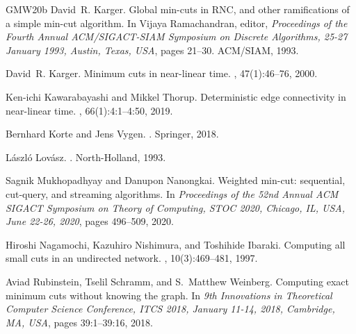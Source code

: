 \documentclass[10pt,a4paper]{article}
\newcommand{\1}{\mathbf{1}}
\theoremstyle{definition}
\begin{document}
\begin{thebibliography}{GMW20b}
David~R. Karger.
\newblock Global min-cuts in {RNC}, and other ramifications of a simple min-cut
  algorithm.
\newblock In Vijaya Ramachandran, editor, {\em Proceedings of the Fourth Annual
  {ACM/SIGACT-SIAM} Symposium on Discrete Algorithms, 25-27 January 1993,
  Austin, Texas, {USA}}, pages 21--30. {ACM/SIAM}, 1993.

David~R. Karger.
\newblock Minimum cuts in near-linear time.
, 47(1):46--76, 2000.

Ken{-}ichi Kawarabayashi and Mikkel Thorup.
\newblock Deterministic edge connectivity in near-linear time.
, 66(1):4:1--4:50, 2019.

Bernhard Korte and Jens Vygen.
.
\newblock Springer, 2018.

L{\'{a}}szl{\'{o}} Lov{\'{a}}sz.
.
\newblock North-Holland, 1993.

Sagnik Mukhopadhyay and Danupon Nanongkai.
\newblock Weighted min-cut: sequential, cut-query, and streaming algorithms.
\newblock In {\em Proceedings of the 52nd Annual ACM SIGACT Symposium on Theory
  of Computing, STOC 2020, Chicago, IL, USA, June 22-26, 2020}, pages 496--509,
  2020.

Hiroshi Nagamochi, Kazuhiro Nishimura, and Toshihide Ibaraki.
\newblock Computing all small cuts in an undirected network.
, 10(3):469--481, 1997.

Aviad Rubinstein, Tselil Schramm, and S.~Matthew Weinberg.
\newblock Computing exact minimum cuts without knowing the graph.
\newblock In {\em 9th Innovations in Theoretical Computer Science Conference,
  {ITCS} 2018, January 11-14, 2018, Cambridge, MA, {USA}}, pages 39:1--39:16,
  2018.

\end{thebibliography}
\end{document}
